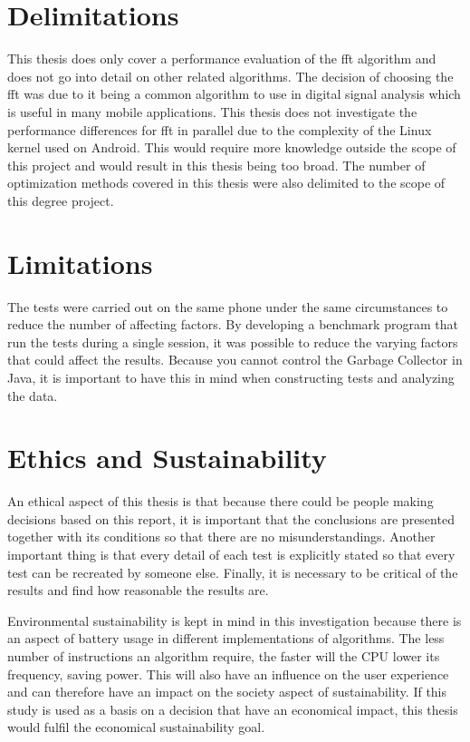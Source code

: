 \section{Delimitations}
This thesis does only cover a performance evaluation of the \gls{fft} algorithm and does not go into detail on other related algorithms. The decision of choosing the \gls{fft} was due to it being a common algorithm to use in digital signal analysis which is useful in many mobile applications. This thesis does not investigate the performance differences for \gls{fft} in parallel due to the complexity of the Linux kernel used on Android. This would require more knowledge outside the scope of this project and would result in this thesis being too broad. The number of optimization methods covered in this thesis were also delimited to the scope of this degree project.

\section{Limitations}
The tests were carried out on the same phone under the same circumstances to reduce the number of affecting factors. By developing a benchmark program that run the tests during a single session, it was possible to reduce the varying factors that could affect the results. Because you cannot control the Garbage Collector in Java, it is important to have this in mind when constructing tests and analyzing the data.

\section{Ethics and Sustainability}
An ethical aspect of this thesis is that because there could be people making decisions based on this report, it is important that the conclusions are presented together with its conditions so that there are no misunderstandings. Another important thing is that every detail of each test is explicitly stated so that every test can be recreated by someone else. Finally, it is necessary to be critical of the results and find how reasonable the results are.

Environmental sustainability is kept in mind in this investigation because there is an aspect of battery usage in different implementations of algorithms. The less number of instructions an algorithm require, the faster will the CPU lower its frequency, saving power. This will also have an influence on the user experience and can therefore have an impact on the society aspect of sustainability. If this study is used as a basis on a decision that have an economical impact, this thesis would fulfil the economical sustainability goal.

